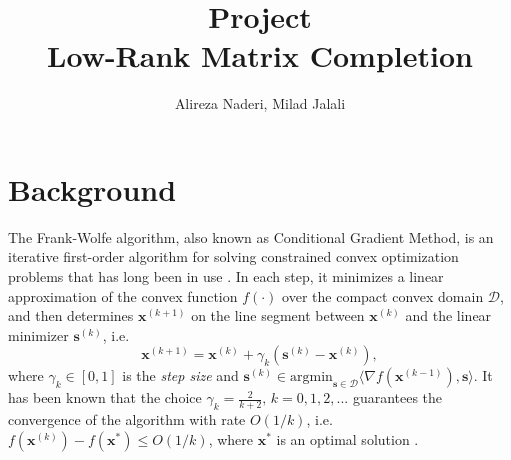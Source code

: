 \documentclass[12pt]{article}
\begin{document}
 
 
\title{Project \\ Low-Rank Matrix Completion}
\author{Alireza Naderi, 
Milad Jalali}

\maketitle

\section{Background}
The Frank-Wolfe algorithm, also known as Conditional Gradient Method, is an iterative first-order algorithm for solving constrained convex optimization problems that has long been in use \cite{FW}. In each step, it minimizes a linear approximation of the convex function $f(\cdot)$ over the compact convex domain $\mathcal{D}$, and then determines $\mathbf{x}^{(k+1)}$ on the line segment between $\mathbf{x}^{(k)}$ and the linear minimizer $\mathbf{s}^{(k)}$, i.e.
\begin{equation}
    \mathbf{x}^{(k+1)} = \mathbf{x}^{(k)} + \gamma_k (\mathbf{s}^{(k)} - \mathbf{x}^{(k)}),
\end{equation}
where $\gamma_k \in [0,1]$ is the \textit{step size} and $\mathbf{s}^{(k)} \in \mathrm{argmin}_{\mathbf{s} \in \mathcal{D}} \langle \nabla f(\mathbf{x}^{(k-1)}), \mathbf{s} \rangle$. It has been known that the choice $\gamma_k = \frac{2}{k+2}, \, k=0,1,2,...$ guarantees the convergence of the algorithm with rate $O(1/k)$, i.e. $f(\mathbf{x}^{(k)}) - f(\mathbf{x}^*) \leq O(1/k)$, where $\mathbf{x}^*$ is an optimal solution \cite{DH}.
\end{document}
